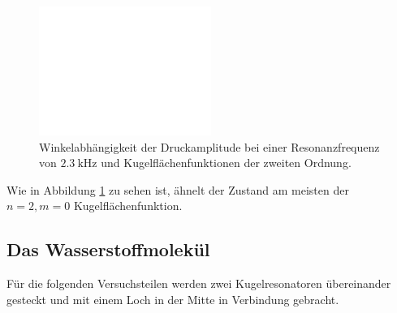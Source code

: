 \begin{figure}
    \centering
    \includegraphics[width=0.5\textwidth]{figure/9mmZwischenring_n2.pdf}
    \caption{Winkelabhängigkeit der Druckamplitude bei einer Resonanzfrequenz von $\SI{2.3}{\kilo\hertz}$ und Kugelflächenfunktionen der zweiten Ordnung.}
    \label{fig:9mmZwischenring_n2}
\end{figure}
\FloatBarrier
Wie in Abbildung \ref{fig:9mmZwischenring_n2} zu sehen ist, ähnelt der Zustand am meisten der $n=2,m=0$ Kugelflächenfunktion.

\subsection{Das Wasserstoffmolekül}
Für die folgenden Versuchsteilen werden zwei Kugelresonatoren übereinander gesteckt und mit einem Loch in der Mitte in Verbindung gebracht.

